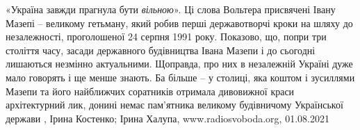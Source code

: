 «Україна завжди прагнула бути \emph{вільною}». Ці слова Вольтера присвячені
Івану Мазепі – великому гетьману, який робив перші державотворчі кроки на шляху
до незалежності, проголошеної 24 серпня 1991 року.  Показово, що, попри три
століття часу, засади державного будівництва Івана Мазепи і до сьогодні
лишаються незмінно актуальними.  Щоправда, про них в незалежній Україні дуже
мало говорять і ще менше знають. Ба більше – у столиці, яка коштом і зусиллями
Мазепи та його найближчих соратників отримала дивовижної краси архітектурний
лик, донині немає пам’ятника великому будівничому Української держави
, 
Ірина Костенко; Ірина Халупа, www.radiosvoboda.org, 01.08.2021
